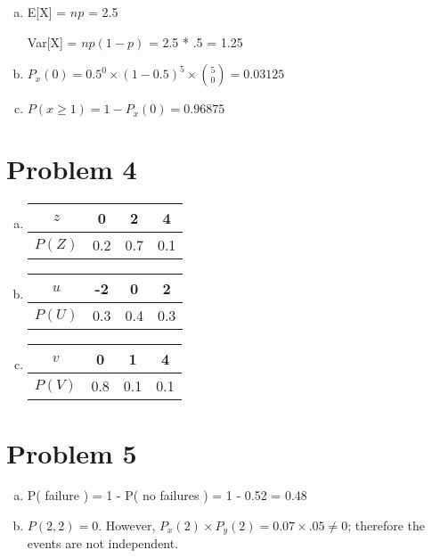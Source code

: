 \documentclass[11pt]{article}
\begin{document}
\begin{enumerate}[(a)]
	\item E[X] = $np$ = 2.5
	
			Var[X] = $np(1-p)$ = 2.5 * .5 = 1.25
	\item $P_x(0) = 0.5^0 \times (1-0.5)^5 \times \binom{5}{0}	 = 0.03125$
	
	\item $P( x \geq 1  ) = 1 - P_x(0) = 0.96875$
	
\end{enumerate}

\section*{Problem 4}

\begin{enumerate}[(a)]
	\item 
		\begin{tabular}{ |c || c | c | c|}
			\hline
			$z$ & 0 & 2 & 4 \\
			\hline
			$P(Z)$ & 0.2 & 0.7 & 0.1 \\
			\hline
		\end{tabular}
		
	\item 
		\begin{tabular}{ |c || c | c | c|}
			\hline
			$u$ & -2 & 0 & 2 \\
			\hline
			$P(U)$ & 0.3 & 0.4 & 0.3 \\
			\hline
		\end{tabular}
		
	\item 
		\begin{tabular}{ |c || c | c | c|}
			\hline
			$v$ & 0 & 1 & 4 \\
			\hline
			$P(V)$ & 0.8 & 0.1 & 0.1 \\
			\hline
		\end{tabular}
\end{enumerate}


\section*{Problem 5}

\begin{enumerate}[(a)]
	\item P( failure ) = 1 - P( no failures ) = 1 - 0.52 = 0.48
	\item $P(2, 2) = 0$. However, $P_x(2) \times P_y(2) = 0.07 \times .05 \neq 0$; therefore the events are not independent.
\end{enumerate}
\end{document}
